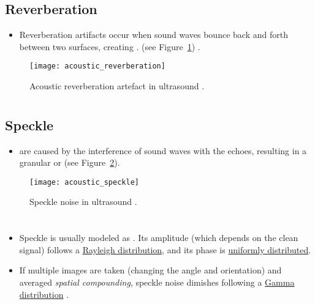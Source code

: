 \subsection{Reverberation}
\begin{itemize}
\item Reverberation artifacts occur when sound waves bounce back and
  forth between two surfaces, creating . (see
  Figure~\ref{fig:acoustic_reverberation}) \cite{NysoraArtifacts}.
\end{itemize}
\vspace{-1ex}
\begin{figure}[!h]
  \centering
  \texttt{[image: acoustic\_reverberation]}
  \caption{Acoustic reverberation artefact in ultrasound
    \cite{NysoraArtifacts}.\label{fig:acoustic_reverberation}}
\end{figure}

\section*{}
\subsection{Speckle}
\begin{itemize}
\item {} are
  caused by the interference of sound waves with the echoes, resulting
  in a granular or   \cite{NysoraArtifacts} (see
  Figure~\ref{fig:acoustic_speckle}).
\end{itemize}
\vspace{-2ex}
\begin{figure}[!h]
  \centering
  \texttt{[image: acoustic\_speckle]}
  \caption{Speckle noise in ultrasound
    \cite{LIASIS2008427}.\label{fig:acoustic_speckle}}
\end{figure}

\section*{}
\begin{itemize}
\item Speckle is usually modeled as . Its amplitude (which depends on the clean
  signal) follows a
  \href{https://en.wikipedia.org/wiki/Rayleigh_distribution}{Rayleigh
    distribution}, and its phase is
  \href{https://en.wikipedia.org/wiki/Discrete_uniform_distribution}{uniformly
    distributed}.

\item If multiple images are taken (changing the angle and
  orientation) and averaged \emph{spatial compounding}, speckle noise
  dimishes following a
  \href{https://en.wikipedia.org/wiki/Gamma_distribution}{Gamma
    distribution} \cite{bushberg2011essential}.
\end{itemize}
